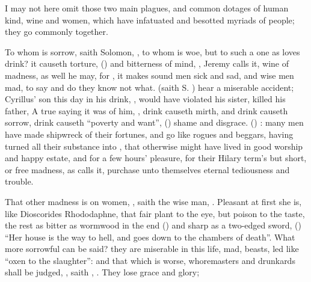 I may not here omit those two main plagues, and common dotages of human kind,
wine and women, which have infatuated and besotted myriads of people; they go
commonly together.


To whom is sorrow, saith Solomon, , to whom is
woe, but to such a one as loves drink? it causeth torture, () and bitterness of mind,  ,
Jeremy calls it,  wine of madness, as well he
may, for , it makes sound men sick and sad, and wise
men mad, to say and do they know not what.  (saith S. \Austin{}) hear a miserable
accident; Cyrillus' son this day in his drink, , would have violated his sister, killed his father,
\etc{} A true saying it was of him, , drink
causeth mirth, and drink causeth sorrow, drink causeth \enquote{poverty and want},
() shame and disgrace.  (\Austin{}) : many men
have made shipwreck of their fortunes, and go like rogues and beggars, having
turned all their substance into , that otherwise might have
lived in good worship and happy estate, and for a few hours' pleasure, for
their Hilary term's but short, or free madness, as \Seneca{}
calls it, purchase unto themselves eternal tediousness and trouble.

That other madness is on women, , saith the wise man,
. Pleasant at first she
is, like Dioscorides Rhododaphne, that fair plant to the eye, but poison to the
taste, the rest as bitter as wormwood in the end ()
and sharp as a two-edged sword, () \enquote{Her house is the way to
hell, and goes down to the chambers of death}. What more sorrowful can be said?
they are miserable in this life, mad, beasts, led like
\enquote{oxen to the slaughter}: and that which is worse,
whoremasters and drunkards shall be judged, , saith
\Austin{}, . They lose grace
and glory;

